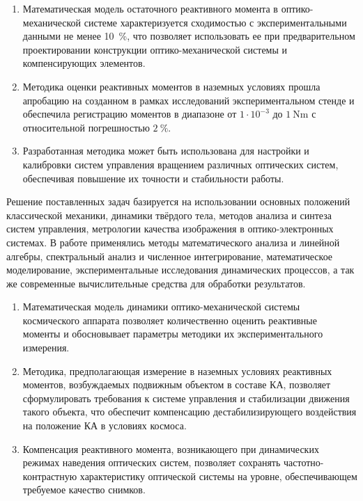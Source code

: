 \begin{enumerate}[beginpenalty=10000] %
	\item Математическая модель остаточного реактивного момента в оптико-механической системе характеризуется сходимостью с экспериментальными данными не менее 10~\%, что позволяет использовать ее при предварительном  проектировании конструкции оптико-механической системы и компенсирующих элементов.
	\item Методика оценки реактивных моментов в наземных условиях прошла апробацию на созданном в рамках исследований экспериментальном стенде и обеспечила регистрацию моментов в диапазоне от $1 \cdot 10^{-3}$ до $\SI{1}{\newton\meter}$ с относительной погрешностью $2 ~\%$.
	\item Разработанная методика может быть использована для настройки и калибровки систем управления вращением различных оптических систем, обеспечивая повышение их точности и стабильности работы.
\end{enumerate}


{\methods} Решение поставленных задач базируется на использовании основных положений классической механики, динамики твёрдого тела, методов анализа и синтеза систем управления, метрологии качества изображения в оптико-электронных системах. В работе применялись методы математического анализа и линейной алгебры, спектральный анализ и численное интегрирование, математическое моделирование, экспериментальные исследования динамических процессов, а так же современные вычислительные средства для обработки результатов.


{}
\begin{enumerate}[beginpenalty=10000] %
  \item Математическая модель динамики оптико-механической системы космического аппарата позволяет количественно оценить реактивные моменты и обосновывает параметры методики их экспериментального измерения.
  \item Методика, предполагающая измерение в наземных условиях реактивных моментов, возбуждаемых подвижным объектом в составе КА, позволяет сформулировать требования к системе управления и стабилизации движения такого объекта, что обеспечит компенсацию дестабилизирующего воздействия на положение КА в условиях космоса.
  \item Компенсация реактивного момента, возникающего при динамических режимах наведения оптических систем, позволяет сохранять частотно-контрастную характеристику оптической системы на уровне, обеспечивающем требуемое качество снимков.
\end{enumerate}

